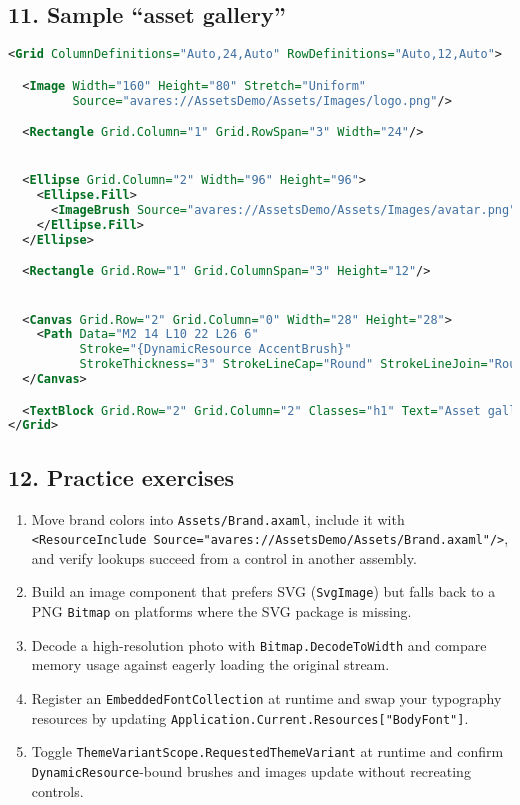\subsection{11. Sample ``asset gallery''}\label{sample-asset-gallery}

\begin{lstlisting}[language=XML]
<Grid ColumnDefinitions="Auto,24,Auto" RowDefinitions="Auto,12,Auto">

  <Image Width="160" Height="80" Stretch="Uniform"
         Source="avares://AssetsDemo/Assets/Images/logo.png"/>

  <Rectangle Grid.Column="1" Grid.RowSpan="3" Width="24"/>


  <Ellipse Grid.Column="2" Width="96" Height="96">
    <Ellipse.Fill>
      <ImageBrush Source="avares://AssetsDemo/Assets/Images/avatar.png" Stretch="UniformToFill"/>
    </Ellipse.Fill>
  </Ellipse>

  <Rectangle Grid.Row="1" Grid.ColumnSpan="3" Height="12"/>


  <Canvas Grid.Row="2" Grid.Column="0" Width="28" Height="28">
    <Path Data="M2 14 L10 22 L26 6"
          Stroke="{DynamicResource AccentBrush}"
          StrokeThickness="3" StrokeLineCap="Round" StrokeLineJoin="Round"/>
  </Canvas>

  <TextBlock Grid.Row="2" Grid.Column="2" Classes="h1" Text="Asset gallery"/>
</Grid>
\end{lstlisting}

\subsection{12. Practice exercises}\label{practice-exercises-4}

\begin{enumerate}
\def\labelenumi{\arabic{enumi}.}
\tightlist
\item
  Move brand colors into \passthrough{\lstinline!Assets/Brand.axaml!},
  include it with
  \passthrough{\lstinline!<ResourceInclude Source="avares://AssetsDemo/Assets/Brand.axaml"/>!},
  and verify lookups succeed from a control in another assembly.
\item
  Build an image component that prefers SVG
  (\passthrough{\lstinline!SvgImage!}) but falls back to a PNG
  \passthrough{\lstinline!Bitmap!} on platforms where the SVG package is
  missing.
\item
  Decode a high-resolution photo with
  \passthrough{\lstinline!Bitmap.DecodeToWidth!} and compare memory
  usage against eagerly loading the original stream.
\item
  Register an \passthrough{\lstinline!EmbeddedFontCollection!} at
  runtime and swap your typography resources by updating
  \passthrough{\lstinline!Application.Current.Resources["BodyFont"]!}.
\item
  Toggle
  \passthrough{\lstinline!ThemeVariantScope.RequestedThemeVariant!} at
  runtime and confirm \passthrough{\lstinline!DynamicResource!}-bound
  brushes and images update without recreating controls.
\end{enumerate}

